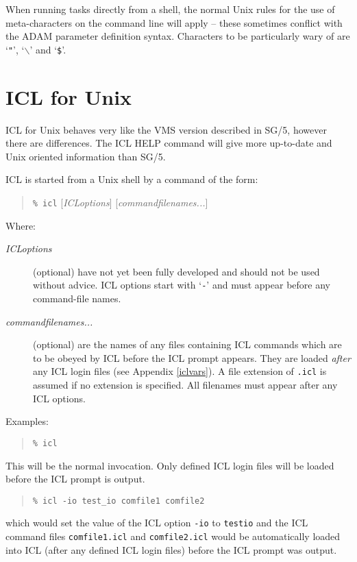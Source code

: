 \documentclass[twoside,11pt]{article}
\newcommand{\xref}[3]{#1}
\newcommand{\xlabel}[1]{}
\renewcommand{\_}{\texttt{\symbol{95}}}
\begin{document}
When running tasks directly from a shell, the normal Unix rules for the 
use of meta-characters on the command line will apply -- these sometimes
conflict with the ADAM parameter definition syntax.
Characters to be particularly wary of are `{\texttt{"}}', 
`{\texttt{$\backslash$}}' and `{\texttt{\$}}'.

\section{\xlabel{icl_for_unix}ICL for Unix}
ICL for Unix behaves very like the VMS version described in 
\xref{SG/5}{sg5}{},
however there are differences. 
The ICL HELP command will give more up-to-date and Unix 
oriented information than SG/5.

ICL is started from a Unix shell by a command of the form:
\begin{quote} 
\texttt{\% icl} [\textit{ICL\_options}\/] [\textit{command\_filenames...}]
\end{quote}
Where:
\begin{description}
\item[\textit{ICL\_options}] (optional) have not yet been fully developed 
and should not be used without advice. ICL options start
with `{\texttt{-}}' and must appear before any command-file names.
\item[\textit{command\_filenames...}] (optional) are the names of any files 
containing ICL commands which are to be obeyed by ICL before the ICL prompt 
appears.
They are loaded \emph{after} any ICL login files (see Appendix \ref{iclvars}).
A file extension of \texttt{.icl} is assumed if no extension is specified. 
All filenames must appear after any ICL options.
\end{description}
Examples:
\begin{quote} \begin{verbatim}
% icl 
\end{verbatim} \end{quote}
This will be the normal invocation. Only defined ICL login files 
will be loaded before the ICL prompt is output.

\begin{quote} \begin{verbatim}
% icl -io test_io comfile1 comfile2
\end{verbatim} \end{quote}
which would set the value of the ICL option \texttt{-io} to \texttt{test\_io}
and the ICL command files \texttt{comfile1.icl} and \texttt{comfile2.icl} 
would be automatically loaded into ICL (after any defined ICL login files) 
before the ICL prompt was output.
\end{document}

